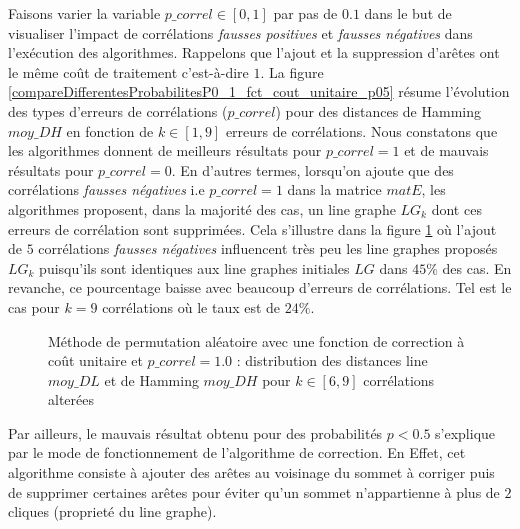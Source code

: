 \documentclass[onecolumn, 12pt]{book}
\begin{document}
Faisons varier la variable $p\_correl \in [0,1]$ par pas de $0.1$ dans le but de visualiser l'impact de corr\'elations {\em fausses positives} et {\em fausses n\'egatives} dans l'ex\'ecution des algorithmes. Rappelons que l'ajout et la suppression d'ar\^etes ont le m\^eme co\^ut de traitement c'est-\`a-dire $1$.
La figure \ref{compareDifferentesProbabilitesP0_1_fct_cout_unitaire_p05} r\'esume l'\'evolution des types d'erreurs de corr\'elations ($p\_correl$) pour des distances de Hamming $moy\_DH$ en fonction de  $k \in [1, 9]$  erreurs de corr\'elations.
\newline 
Nous constatons que les algorithmes donnent de meilleurs r\'esultats pour $p\_correl = 1$ et de mauvais r\'esultats pour $p\_correl = 0$. 
En d'autres termes, lorsqu'on ajoute que des corr\'elations {\em fausses n\'egatives} i.e $p\_correl  = 1$ dans la matrice $matE$, les algorithmes  proposent, dans la majorit\'e des cas, un line graphe $LG_k$ dont ces erreurs de corr\'elation sont supprim\'ees. Cela s'illustre dans la figure \ref{permut_distanceMoyenDLDH_k_5_9_aleatoire_p_10} o\`u l'ajout de $5$ corr\'elations {\em fausses n\'egatives} influencent tr\`es peu les line graphes propos\'es $LG_{k}$ puisqu'ils sont identiques aux line graphes initiales $LG$ dans $45\%$ des cas. 
En revanche, ce pourcentage baisse avec beaucoup d'erreurs de corr\'elations. Tel est le cas pour $k = 9$ corr\'elations o\`u le taux est de $24\%$. 
\begin{figure}[htb!] 
\centering
\caption{ M\'ethode de permutation al\'eatoire avec une fonction de correction \`a co\^ut unitaire et $p\_correl = 1.0$ : distribution des distances line $moy\_DL$ et de Hamming $moy\_DH$ pour $k \in [6,  9]$ corr\'elations alter\'ees}
\label{permut_distanceMoyenDLDH_k_5_9_aleatoire_p_10} 
\end{figure}
\newline
Par ailleurs, le mauvais r\'esultat obtenu pour des probabilit\'es $p < 0.5$ s'explique par le mode de fonctionnement de l'algorithme de correction. En Effet, cet algorithme consiste \`a ajouter des ar\^etes au voisinage du sommet \`a corriger puis de supprimer certaines ar\^etes pour \'eviter qu'un sommet n'appartienne \`a plus de $2$ cliques (propriet\'e du line graphe).
\newline
\end{document}
